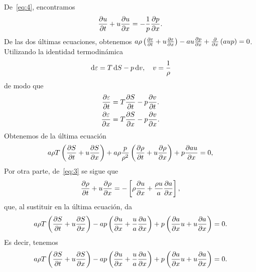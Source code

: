 \documentclass[
    8pt,
    aspectratio=1610,
    c,
    intlimits,
		handout,
    leqno,
    professionalfonts,
]{beamer}
\begin{document}
\begin{frame}
	De~\eqref{eq:4}, encontramos
	\begin{equation*}
		\diffp{u}{t}+
		u\diffp{u}{x}=
		-\frac{1}{p}
		\diffp{p}{x}.
	\end{equation*}
	De las dos últimas ecuaciones, obtenemos
	\begin{math}
		a\rho\left(\diffp{\varepsilon}{t}+u\diffp{\varepsilon}{x}\right)-
		au\diffp{p}{x}+
		\diffp{}{x}\left(aup\right)=
		0
	\end{math}.
	Utilizando la identidad termodinámica
	\begin{equation*}
		\dl\varepsilon=
		T\dl S-p\dl v,\quad
		v=
		\frac{1}{\rho}
	\end{equation*}
	de modo que
	\begin{align*}
		\diffp{\varepsilon}{t} & =
		T\diffp{S}{t}-p\diffp{v}{t}. \\
		\diffp{\varepsilon}{x} & =
		T\diffp{S}{x}-p\diffp{v}{x}.
	\end{align*}
	Obtenemos de la última ecuación
	\begin{equation*}
		a\rho T\left(\diffp{S}{t}+u\diffp{S}{x}\right)+
		a\rho\frac{p}{\rho^{2}}
		\left(\diffp{\rho}{t}+u\diffp{\rho}{x}\right)+
		p\diffp{au}{x}=0,
	\end{equation*}
	Por otra parte, de~\eqref{eq:3} se sigue que
	\begin{equation*}
		\diffp{\rho}{t}+
		u\diffp{\rho}{x}=
		-\left[\rho\diffp{u}{x}+\frac{\rho u}{a}\diffp{a}{x}\right],
	\end{equation*}
	que, al sustituir en la última ecuación, da
	\begin{equation*}
		a\rho T
		\left(\diffp{S}{t}+u\diffp{S}{x}\right)-
		ap
		\left(\diffp{u}{x}+\frac{u}{a}\diffp{a}{x}\right)+
		p\left(\diffp{a}{x}u+u\diffp{a}{x}\right)=
		0.
	\end{equation*}
	Es decir, tenemos
	\begin{equation*}
		a\rho T\left(\diffp{S}{t}+u\diffp{S}{x}\right)-
		ap\left(\diffp{u}{x}+\frac{u}{a}\diffp{a}{x}\right)+
		p\left(\diffp{a}{x}u+u\diffp{a}{x}\right)=
		0.
	\end{equation*}
\end{frame}
\end{document}
